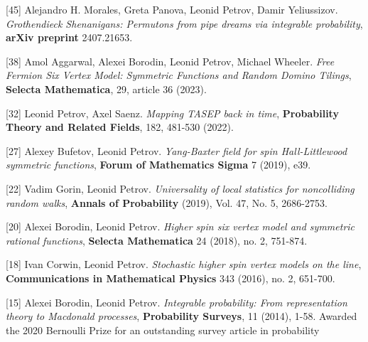 \documentclass[letterpaper,11pt]{article}
\begin{document}
\begin{etaremune}


\item[{[45]}]
Alejandro H. Morales, Greta Panova, Leonid Petrov, Damir Yeliussizov.
\emph{Grothendieck Shenanigans: Permutons from pipe dreams via integrable probability}, 
\textbf{arXiv preprint} 2407.21653.
		
		\item[{[38]}] 
		Amol Aggarwal, Alexei Borodin, Leonid Petrov, Michael Wheeler.
		\emph{Free Fermion Six Vertex Model: Symmetric Functions and Random Domino Tilings}, \textbf{Selecta Mathematica}, 29, article 36 (2023).
	
		\item[{[32]}] 
		Leonid Petrov, Axel Saenz.
		\emph{Mapping TASEP back in time}, \textbf{Probability Theory and Related Fields}, 182, 481-530 (2022). 

	
		\item[{[27]}] 
		Alexey Bufetov, Leonid Petrov.
		\emph{Yang-Baxter field for spin Hall-Littlewood symmetric functions}, \textbf{Forum of Mathematics Sigma} 7 (2019), e39. 

		
		\item[{[22]}] 
		Vadim Gorin, Leonid Petrov.
		\emph{Universality of local statistics for noncolliding random walks}, \textbf{Annals of Probability} (2019), Vol. 47, No. 5, 2686-2753. 

			
		\item[{[20]}] 
		Alexei Borodin, Leonid Petrov.
		\emph{Higher spin six vertex model and symmetric rational functions}, \textbf{Selecta Mathematica} 24 (2018), no. 2, 751-874. 

		\item[{[18]}] 
		Ivan Corwin, Leonid Petrov.
		\emph{Stochastic higher spin vertex models on the line}, \textbf{Communications in Mathematical Physics} 343 (2016), no. 2, 651-700. 

		
		
		\item[{[15]}] 
		Alexei Borodin, Leonid Petrov.
		\emph{Integrable probability: From representation theory to Macdonald processes}, \textbf{Probability Surveys}, 11 (2014), 1-58. 
		 Awarded the 2020 Bernoulli Prize for 
		an outstanding survey article in probability 
		
		
		
		


\end{etaremune}
\end{document}
